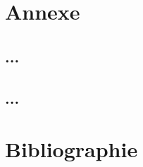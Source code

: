 \documentclass[oneside,13pt,a4paper]{report}
\begin{document}

\appendix
\chapter{Annexe}

\section{...}

\section{...}

\chapter{Bibliographie}
\end{document}
